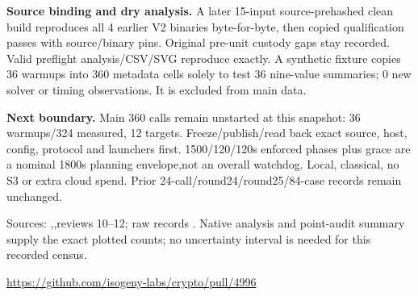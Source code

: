 \documentclass[10pt]{article}
\begin{document}
\textbf{Source binding and dry analysis.} A later 15-input source-prehashed clean
build reproduces all 4 earlier V2 binaries byte-for-byte, then copied qualification
passes with source/binary pins. Original pre-unit custody gaps stay recorded.
Valid preflight analysis/CSV/SVG reproduce exactly. A synthetic fixture copies
36 warmups into 360 metadata cells solely to test 36 nine-value summaries; 0 new solver
or timing observations. It is excluded from main data.

\textbf{Next boundary.} Main 360 calls remain unstarted at this snapshot:
36 warmups/324 measured, 12 targets. Freeze/publish/read back exact source, host, config,
protocol and launchers first. 1500/120/120s enforced phases plus grace are a nominal
1800s planning envelope,not an overall watchdog. Local, classical, no S3 or extra
cloud spend. Prior 24-call/round24/round25/84-case records remain unchanged.

\small Sources: ,,reviews 10--12;
raw records . Native analysis
and point-audit summary supply the exact plotted counts; no uncertainty interval
is needed for this recorded census.\par
\url{https://github.com/isogeny-labs/crypto/pull/4996}
\end{document}
